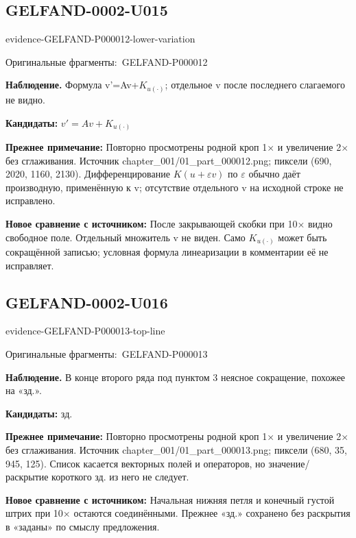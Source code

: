 \documentclass[11pt]{article}
\newcommand{\EvidenceBlock}[4]{%
 \par\smallskip\noindent\begin{minipage}{\linewidth}
 \begin{minipage}[t]{.47\linewidth}\vspace{0pt}\centering
 \csname evidence-#1-#2\endcsname\par
 {\scriptsize\SourceCropCaption\ #1}\par
 \end{minipage}\hfill
 \begin{minipage}[t]{.49\linewidth}\vspace{0pt}\raggedright
 {\small\color{orange!65!black}\textbf{#4} #3}\par
 \end{minipage}
 \end{minipage}\par\smallskip}
\newcommand{\SourceCropCaption}{Оригинальные фрагменты:}\newcommand{\ReadingCaption}{Сомнительное чтение.}\newcommand{\IncompleteCaption}{Неразобранный фрагмент.}\newcommand{\DiagramCaption}{Рисунок и набранное описание.}
\begin{document}
\subsection*{GELFAND-0002-U015}
\EvidenceBlock{GELFAND-P000012}{lower-variation}{Формула v'=Av+\(K_{u(\cdot)}\); отдельное v после последнего слагаемого не видно.}{Наблюдение.}
\par\smallskip\noindent\textbf{Кандидаты: } \(v'=Av+K_{u(\cdot)}\)\par
\par\smallskip\noindent\textbf{Прежнее примечание: } Повторно просмотрены родной кроп 1× и увеличение 2× без сглаживания. Источник chapter\_001/01\_part\_000012.png; пиксели (690, 2020, 1160, 2130). Дифференцирование \(K(u+\varepsilon v)\) по \(\varepsilon\) обычно даёт производную, применённую к v; отсутствие отдельного v на исходной строке не исправлено.\par
\par\smallskip\noindent\textbf{Новое сравнение с источником: } После закрывающей скобки при 10× видно свободное поле. Отдельный множитель v не виден. Само \(K_{u(\cdot)}\) может быть сокращённой записью; условная формула линеаризации в комментарии её не исправляет.\par

\subsection*{GELFAND-0002-U016}
\EvidenceBlock{GELFAND-P000013}{top-line}{В конце второго ряда под пунктом 3 неясное сокращение, похожее на «зд.».}{Наблюдение.}
\par\smallskip\noindent\textbf{Кандидаты: } зд.\par
\par\smallskip\noindent\textbf{Прежнее примечание: } Повторно просмотрены родной кроп 1× и увеличение 2× без сглаживания. Источник chapter\_001/01\_part\_000013.png; пиксели (680, 35, 945, 125). Список касается векторных полей и операторов, но значение/раскрытие короткого зд. из него не следует.\par
\par\smallskip\noindent\textbf{Новое сравнение с источником: } Начальная нижняя петля и конечный густой штрих при 10× остаются соединёнными. Прежнее «зд.» сохранено без раскрытия в «заданы» по смыслу предложения.\par
\end{document}
